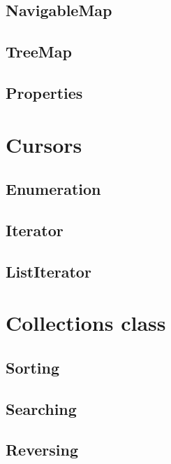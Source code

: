 \documentclass[14pt,fleqn]{extbook} %
\begin{document}
\subsection{NavigableMap}

\subsection{TreeMap}

%
\subsection{Properties}

\section{Cursors}

\subsection{Enumeration}

\subsection{Iterator}

\subsection{ListIterator}

\section{Collections class}

\subsection{Sorting}

\subsection{Searching}

\subsection{Reversing}

\end{document}
